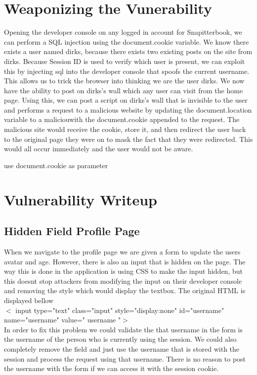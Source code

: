 \documentclass[12pt]{article}
\begin{document}
\maketitle

\section{Weaponizing the Vunerability}
Opening the developer console on any logged in account for Snapitterbook, we can perform a SQL injection using the document.cookie variable.  We know there exists a user named dirks, because there exists two existing posts on the site from dirks.  Because Session ID is used to verify which user is present, we can exploit this by injecting sql into the developer console that spoofs the current username.  This allows us to trick the browser into thinking we are the user dirks.  We now have the ability to post on dirks's wall which any user can visit from the home page.  Using this, we can post a script on dirks's wall that is invisible to the user and performs a request to a malicious website by updating the document.location variable to a maliciouwith the document.cookie appended to the request.  The malicious site would receive the cookie, store it, and then redirect the user back to the original page they were on to mask the fact that they were redirected.  This would all occur immediately and the user would not be aware.

use document.cookie as parameter
\section{Vulnerability Writeup}
\subsection{Hidden Field Profile Page}
When we navigate to the profile page we are given a form to update the users avatar and age. However, there is also an input that is hidden on the page. The way this is done in the application is using CSS to make the input hidden, but this doesnt stop attackers from modifying the input on their developer console and removing the style which would display the textbox. The original HTML is displayed bellow \\
$<$ input type="text" class="input" style="display:none" id="username" name="username" value="{{ username }}"$>$ \\
In order to fix this problem we could validate the that username in the form is the username of the person who is currently using the session. We could also completely remove the field and just use the username that is stored with the session and process the request using that username. There is no reason to post the username with the form if we can access it with the session cookie.
\end{document}
